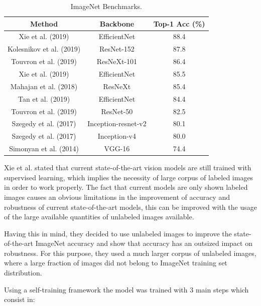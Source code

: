 \begin{table}[htb]
    
    \centering
    \caption {ImageNet Benchmarks.}
    \begin{tabular}{|| c | c | c ||} 
    \hline
    Method & Backbone & Top-1 Acc (\%)  \\ [0.5ex] 
    \hline\hline
    Xie et al. (2019) \cite{Xie2019}& EfficientNet & 88.4
    \\ 
    \hline
    Kolesnikov et al. (2019) \cite{alex2019large} & ResNet-152 & 87.8

    \\
    \hline
    Touvron et al. (2019) \cite{touvron2019fixing} & ResNeXt-101 & 86.4

    \\
    \hline
    Xie et al. (2019) \cite{xie2019adversarial} & EfficientNet & 85.5

    \\ [1ex] 
    \hline
    Mahajan et al. (2018) \cite{Mahajan2018} & ResNeXt & 85.4

    \\ [1ex]
    \hline
    Tan et al. (2019) \cite{tan2019efficientnet}& EfficientNet & 84.4

    \\ [1ex]
    \hline
    Touvron et al. (2019) \cite{touvron2019fixing} & ResNet-50 & 82.5

    \\ [1ex]
    \hline
    Szegedy et al. (2017) \cite{szegedy2016inceptionv4} & Inception-resnet-v2 & 80.1

    \\ [1ex]
    \hline
    Szegedy et al. (2017) \cite{szegedy2016inceptionv4}  & Inception-v4 & 80.0

    \\ [1ex]
    \hline
    Simonyan et al. (2014) \cite{simonyan2014deep} & VGG-16 & 74.4
    \\ [1ex]
    \hline
   \end{tabular}
   \label{table:imagenettable}
\end{table}



\par Xie et al. \cite{Xie2019} stated that current state-of-the-art vision models are still trained with supervised learning, which implies the necessity of large corpus of labeled images in order to work properly. The fact that current models are only shown labeled images causes an obvious limitations in the improvement of accuracy and robustness of current state-of-the-art models, this can be improved with the usage of the large available quantities of unlabeled images available.
\par Having this in mind, they decided to use unlabeled images to improve the state-of-the-art ImageNet accuracy and show that accuracy has an outsized impact on robustness. For this purpose, they used a much larger corpus of unlabeled images, where a large fraction of images did not belong to ImageNet training set distribution.
\par Using a self-training framework the model was trained with 3 main steps which consist in:

